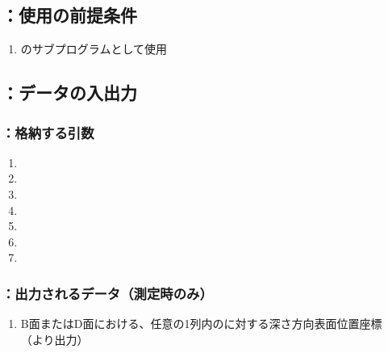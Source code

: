 \subsection{\DLtwoBD：使用の前提条件}
\begin{enumerate}[label*=\sarrow]
\item \DLone のサブプログラムとして使用
\end{enumerate}


\subsection{\DLtwoBD：データの入出力}

\subsubsection{\DLtwoBD：格納する引数}
\begin{enumerate}[label*=\sarrow]
\item \PMBDFaceSelectionFlag
\item \PMDimpleAngle
\item \PMDimpleHorizontalPitch
\item \PMDimpleOddRowLength
\item \PMDimpleEvenRowLength
\item \PMDimpleRowNum
\item \PMDimpleDepth
\end{enumerate}

\subsubsection{\DLtwoBD：出力されるデータ（測定時のみ）}
\begin{enumerate}[label*=\sarrow]
\item B面またはD面における、任意の1列内の\Dimple に対する深さ方向表面位置座標\\
（\DMLthreeBD より出力）
\end{enumerate}

